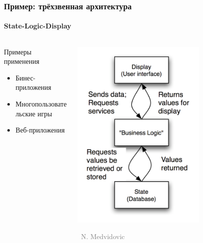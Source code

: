 \documentclass[xetex,mathserif,serif]{beamer}
\newcommand{\attribution}[1] {
    \vspace{-5mm}\begin{flushright}\begin{scriptsize}\textcolor{gray}{\textcopyright\, #1}\end{scriptsize}\end{flushright}
}
\begin{document}
    \begin{frame}
        \frametitle{Пример: трёхзвенная архитектура}
        \framesubtitle{State-Logic-Display}
        \begin{columns}
            \begin{column}{0.5\textwidth}
                Примеры применения
                \begin{itemize}
                    \item Бинес-приложения
                    \item Многопользовательские игры
                    \item Веб-приложения
                \end{itemize}
            \end{column}
            \begin{column}{0.5\textwidth}
                \begin{center}
                    \includegraphics[width=0.7\textwidth]{threeTieredArchitecture.png}
                    \attribution{N. Medvidovic}
                \end{center}
            \end{column}
        \end{columns}
    \end{frame}
\end{document}
